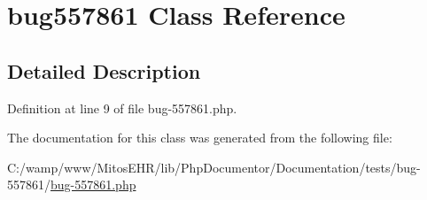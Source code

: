 \hypertarget{classbug557861}{\section{bug557861 \-Class \-Reference}
\label{classbug557861}
}


\subsection{\-Detailed \-Description}


\-Definition at line 9 of file bug-\/557861.\-php.



\-The documentation for this class was generated from the following file\-:\begin{DoxyCompactItemize}
\item 
\-C\-:/wamp/www/\-Mitos\-E\-H\-R/lib/\-Php\-Documentor/\-Documentation/tests/bug-\/557861/\hyperlink{bug-557861_8php}{bug-\/557861.\-php}\end{DoxyCompactItemize}
